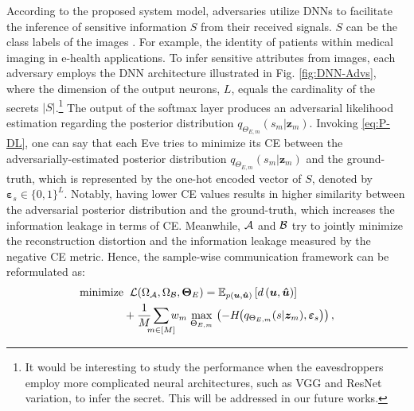 \documentclass[conference]{IEEEtran}
\begin{document}
\vspace{-0.5mm}	
According to the proposed system model,  adversaries 
	utilize DNNs to facilitate the inference   of  sensitive  information $S$ from their received signals.  $S$ can be 
	the class labels of the images  \cite{AE-Deniz, Ecenaz-icassp}.    
	For example, the identity of patients within  medical imaging in e-health applications.    
	To 
	infer   sensitive attributes from images,  each adversary employs the DNN architecture illustrated in Fig. \ref{fig:DNN-Advs}, where the  dimension of the  output  neurons, $L$, equals the 
	cardinality  of the secrets $|S|$.\footnote{It would be interesting to 	study the  performance when the eavesdroppers employ more complicated neural  architectures, such as VGG and ResNet variation, to infer the secret. This will be addressed in our future works.} 
	The output of the softmax layer produces  an adversarial likelihood  estimation regarding the posterior  distribution  $q_{\Theta_{E,m}}({s_m|{\boldsymbol z}_m})$.  
	\vspace{-0.5mm}
	Invoking  \eqref{eq:P-DL},  one can say that each Eve  tries to minimize its CE between the adversarially-estimated posterior  distribution $q_{\Theta_{E,m}}({s_m|{\boldsymbol z}_m})$ and the ground-truth, which is represented by the one-hot encoded vector of $S$, denoted by  $ {{\bm \varepsilon}_s} \in \{0,1\}^L$.   
	Notably, having lower CE values results in  
	higher similarity between the  adversarial posterior distribution    	and the ground-truth, which increases the information leakage in terms of CE.    
	Meanwhile, $\cal A$ and $\cal B$  try to jointly  minimize the reconstruction distortion  and the information leakage  measured by the negative CE metric. 
Hence,  the  sample-wise  communication framework  can be reformulated as:   
	\begin{align}\label{eq:P-DL-CE}
		\text{minimize}	\hspace{2mm} & \mathcal{L}(\Omega_{\cal A},\Omega_{\cal B},\mathbf{\Theta}_E)  = 
		\mathbb{E}_{p(\bm{u},\bm{\hat{u}})} \left[	d\left(\bm u,
		\bm{\hat{u}}
		\right)
		\right] 
		\nonumber \\ 
		& \hspace{-2mm}+ 
		\frac{1}{M}	\hspace{-2mm} \sum_{m \in [M]} \hspace{-2mm}  w_m \hspace{1mm}
		\underset{\Theta_{E,m}}{\text{max}}
		\hspace{0.5mm}
		\left(- H\hspace{-1mm}\left(q_{\Theta_{E,m}}({s|{\boldsymbol z}_m}),{{\bm \varepsilon}_s}\right)\right), 
	\end{align}
\end{document}

